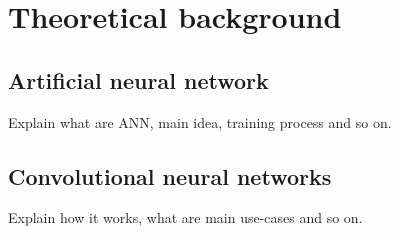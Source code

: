 \chapter{Theoretical background}
\section{Artificial neural network}
Explain what are ANN, main idea, training process and so on.

\section{Convolutional neural networks}
Explain how it works, what are main use-cases and so on.
